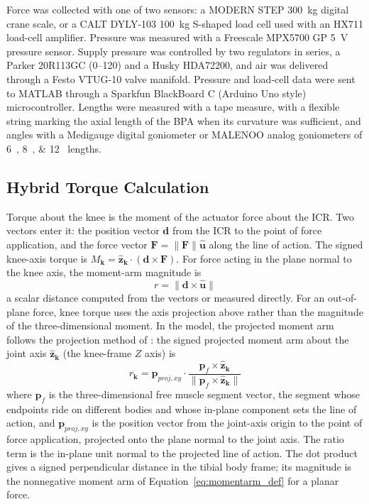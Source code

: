 \documentclass[utf8]{FrontiersinHarvard} %
\providecommand{\norm}[1]{\lVert#1\rVert}
\begin{document}
Force was collected with one of two sensors: a MODERN STEP \qty{300}{\kilo\gram} digital crane scale, or a CALT DYLY-103 \qty{100}{\kilo\gram} S-shaped load cell used with an HX711 load-cell amplifier. Pressure was measured with a Freescale MPX5700 GP \qty{5}{\volt} pressure sensor. Supply pressure was controlled by two regulators in series, a Parker 20R113GC (\qtyrange{0}{120}{\pressurepsi}) and a Husky HDA72200, and air was delivered through a Festo VTUG-10 valve manifold. Pressure and load-cell data were sent to MATLAB through a Sparkfun BlackBoard C (Arduino Uno style) microcontroller. Lengths were measured with a tape measure, with a flexible string marking the axial length of the BPA when its curvature was sufficient, and angles with a Medigauge digital goniometer or MALENOO analog goniometers of \qtylist{6;8;12}{\inch} lengths.

\subsection{Hybrid Torque Calculation}\label{sec:hybrid_method}

Torque about the knee is the moment of the actuator force about the ICR. Two vectors enter it: the position vector $\mathbf{d}$ from the ICR to the point of force application, and the force vector $\mathbf{F} = \norm{\mathbf{F}}\hat{\mathbf{u}}$ along the line of action. The signed knee-axis torque is $M_{\mathbf{k}}=\hat{\mathbf{z}}_{\mathbf{k}}\cdot(\mathbf{d}\times\mathbf{F})$. For force acting in the plane normal to the knee axis, the moment-arm magnitude is
\begin{equation}
    r = \norm{\mathbf{d} \times \hat{\mathbf{u}}}
    \label{eq:momentarm_def}
\end{equation}
a scalar distance computed from the vectors or measured directly. For an out-of-plane force, knee torque uses the axis projection above rather than the magnitude of the three-dimensional moment. In the model, the projected moment arm follows the projection method of \citet{young_analyzing_2019}: the signed projected moment arm about the joint axis $\hat{\mathbf{z}}_{\mathbf{k}}$ (the knee-frame $Z$ axis) is
\begin{equation}
    r_{\mathbf{k}} = \mathbf{p}_{proj,xy} \cdot \frac{\mathbf{p}_{f} \times \hat{\mathbf{z}}_{\mathbf{k}}} {\norm{\mathbf{p}_{f} \times \hat{\mathbf{z}}_{\mathbf{k}}}} \label{eq:project_ma}
\end{equation}
where $\mathbf{p}_{f}$ is the three-dimensional free muscle segment vector, the segment whose endpoints ride on different bodies and whose in-plane component sets the line of action, and $\mathbf{p}_{proj,xy}$ is the position vector from the joint-axis origin to the point of force application, projected onto the plane normal to the joint axis. The ratio term is the in-plane unit normal to the projected line of action. The dot product gives a signed perpendicular distance in the tibial body frame; its magnitude is the nonnegative moment arm of Equation~\eqref{eq:momentarm_def} for a planar force.
\end{document}
